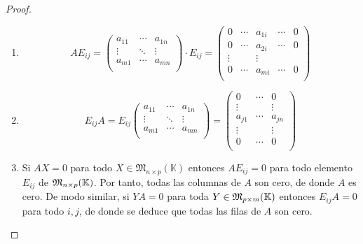\begin{proof}
	\begin{enumerate}
		\item \[
			      AE_{ij} = \begin{pmatrix}
				      a_{11} & \cdots & a_{1n} \\
				      \vdots & \ddots & \vdots \\
				      a_{m1} & \cdots & a_{mn} \\
			      \end{pmatrix} \cdot E_{ij} = \begin{pmatrix}
				      0      & \cdots & a_{1i } & \cdots & 0 \\
				      0      & \cdots & a_{2i } & \cdots & 0 \\
				      \vdots &        & \vdots  &        &   \\
				      0      & \cdots & a_{mi } & \cdots & 0 \\
			      \end{pmatrix}
		      \]
		\item
		      \[
			      E_{ij}A = E_{ij }\begin{pmatrix}
				      a_{11} & \cdots & a_{1n} \\
				      \vdots & \ddots & \vdots \\
				      a_{m1} & \cdots & a_{mn} \\
			      \end{pmatrix} = \begin{pmatrix}
				      0       & \cdots & 0       \\
				      \vdots  &        & \vdots  \\
				      a_{j1 } & \cdots & a_{jn } \\
				      \vdots  &        & \vdots  \\
				      0       & \cdots & 0       \\
			      \end{pmatrix}
		      \]
		\item Si \(AX = 0 \) para todo \(X \in \mathfrak{M}_{n \times p}(\mathbb{K}) \) entonces \(AE_{ij} = 0 \) para todo elemento \(E_{ij}\) de \(\mathfrak{\MakeUppercase{m}}_{n \times p }(\K )\). Por tanto, todas las columnas de \(A \) son cero, de donde \(A \) es cero. De modo similar, si \(YA = 0\) para toda \(Y \in \mathfrak{\MakeUppercase{m}}_{p \times m}(\K )\) entonces \(E_{ij}A = 0 \) para todo \(i,j \), de donde se deduce que todas las filas de \(A \) son cero.
	\end{enumerate}
\end{proof}

